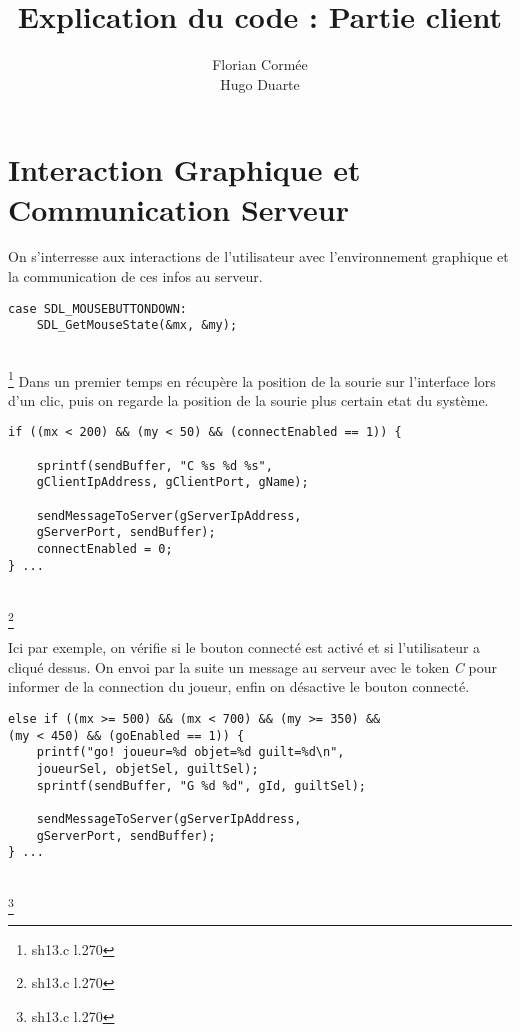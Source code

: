 \documentclass[11pt]{article}
\title{\textbf{Explication du code : Partie client}}
\author{Florian Cormée\\
		Hugo Duarte}
\date{}
\newenvironment{DDbox}[1]{
\begin{lrbox}{\BBbox}\begin{minipage}{\linewidth}}
{\end{minipage}\end{lrbox}\noindent\colorbox{Zgris}{\usebox{\BBbox}} \\
[.5cm]}
\begin{document}
\maketitle

\section{Interaction Graphique et Communication Serveur}

On s'interresse aux interactions de l'utilisateur avec l'environnement graphique et la communication de ces infos au serveur.\\

\begin{DDbox}{\linewidth}
\begin{Verbatim}
case SDL_MOUSEBUTTONDOWN:
	SDL_GetMouseState(&mx, &my);
\end{Verbatim}
\end{DDbox}
\footnote{sh13.c l.270}
Dans un premier temps en récupère la position de la sourie sur l'interface lors d'un clic, puis on regarde la position de la sourie plus certain etat du système. 
\vspace{1em}

\begin{DDbox}{\linewidth}
\begin{Verbatim}
if ((mx < 200) && (my < 50) && (connectEnabled == 1)) {

	sprintf(sendBuffer, "C %s %d %s", 
	gClientIpAddress, gClientPort, gName);

	sendMessageToServer(gServerIpAddress,
	gServerPort, sendBuffer);
	connectEnabled = 0;
} ...
\end{Verbatim}
\end{DDbox}
\footnote{sh13.c l.270}

Ici par exemple, on vérifie si le bouton connecté est activé et si l'utilisateur a cliqué dessus. On envoi par la suite un message au serveur avec le token \emph{C} pour informer de la connection du joueur, enfin on désactive le bouton connecté.

\begin{DDbox}{\linewidth}
\begin{Verbatim}
else if ((mx >= 500) && (mx < 700) && (my >= 350) &&
(my < 450) && (goEnabled == 1)) {
	printf("go! joueur=%d objet=%d guilt=%d\n",
	joueurSel, objetSel, guiltSel);
	sprintf(sendBuffer, "G %d %d", gId, guiltSel);

	sendMessageToServer(gServerIpAddress, 
	gServerPort, sendBuffer);
} ...
\end{Verbatim}
\end{DDbox}
\footnote{sh13.c l.270}
\end{document}
